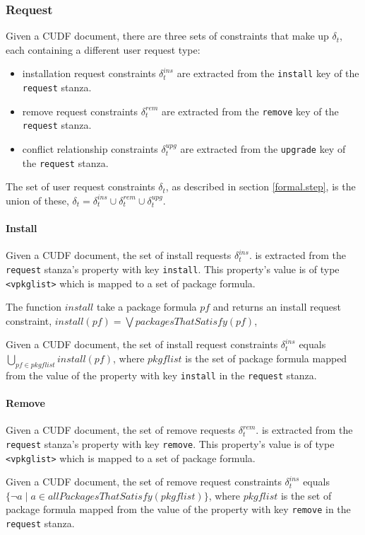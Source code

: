 \subsubsection{Request}
\label{formal.cudf.request}
Given a CUDF document, there are three sets of constraints that make up $\delta_t$, each containing a different user request type:
\begin{itemize}
  \item installation request constraints $\delta_t^{ins}$ are extracted from the \verb+install+ key of the \texttt{request} stanza.
  \item remove request constraints  $\delta_t^{rem}$ are extracted from the \verb+remove+ key of the \texttt{request} stanza.
  \item conflict relationship constraints $\delta_t^{upg}$ are extracted from the \verb+upgrade+ key of the \texttt{request} stanza.
\end{itemize}
The set of user request constraints $\delta_t$, as described in section \ref{formal.step}, is the union of these,
$\delta_t =  \delta_t^{ins} \cup \delta_t^{rem} \cup \delta_t^{upg}$.

\paragraph{Install}
Given a CUDF document, the set of install requests $\delta_t^{ins}$. is extracted from the \texttt{request} stanza's property with key \texttt{install}.
This property's value is of type \texttt{<vpkglist>} which is mapped to a set of package formula.
\begin{defs}
The function  $install$ take a package formula $pf$ and returns an install request constraint, $install(pf) = \bigvee packagesThatSatisfy(pf)$, 
\end{defs}

\begin{defs}
Given a CUDF document, the set of install request constraints $\delta_t^{ins}$  equals
$\bigcup \limits_{pf \in pkgflist} install(pf)$, 
where $pkgflist$ is the set of package formula mapped from the value of the property with key \texttt{install} in the \texttt{request} stanza.
\end{defs}

\paragraph{Remove}
Given a CUDF document, the set of remove requests $\delta_t^{rem}$. is extracted from the \texttt{request} stanza's property with key \texttt{remove}.
This property's value is of type \texttt{<vpkglist>} which is mapped to a set of package formula.
\begin{defs}
Given a CUDF document, the set of remove request constraints $\delta_t^{ins}$ equals $\{ \neg a \mid a \in allPackagesThatSatisfy(pkgflist)\}$, 
where $pkgflist$ is the set of package formula mapped from the value of the property with key \texttt{remove} in the \texttt{request} stanza.
\end{defs}



